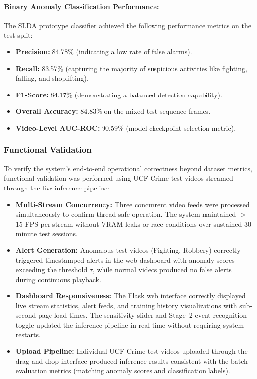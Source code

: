 \documentclass[12pt]{article}
\begin{document}
\paragraph{Binary Anomaly Classification Performance:}
The SLDA prototype classifier achieved the following performance metrics on the test split:
\begin{itemize}
    \item \textbf{Precision:} 84.78\% (indicating a low rate of false alarms).
    \item \textbf{Recall:} 83.57\% (capturing the majority of suspicious activities like fighting, falling, and shoplifting).
    \item \textbf{F1-Score:} 84.17\% (demonstrating a balanced detection capability).
    \item \textbf{Overall Accuracy:} 84.83\% on the mixed test sequence frames.
    \item \textbf{Video-Level AUC-ROC:} 90.59\% (model checkpoint selection metric).
\end{itemize}

\subsubsection{Functional Validation}
To verify the system's end-to-end operational correctness beyond dataset metrics, functional validation was performed using UCF-Crime test videos streamed through the live inference pipeline:
\begin{itemize}
    \item \textbf{Multi-Stream Concurrency:} Three concurrent video feeds were processed simultaneously to confirm thread-safe operation. The system maintained $>$15 FPS per stream without VRAM leaks or race conditions over sustained 30-minute test sessions.
    \item \textbf{Alert Generation:} Anomalous test videos (Fighting, Robbery) correctly triggered timestamped alerts in the web dashboard with anomaly scores exceeding the threshold $\tau$, while normal videos produced no false alerts during continuous playback.
    \item \textbf{Dashboard Responsiveness:} The Flask web interface correctly displayed live stream statistics, alert feeds, and training history visualizations with sub-second page load times. The sensitivity slider and Stage~2 event recognition toggle updated the inference pipeline in real time without requiring system restarts.
    \item \textbf{Upload Pipeline:} Individual UCF-Crime test videos uploaded through the drag-and-drop interface produced inference results consistent with the batch evaluation metrics (matching anomaly scores and classification labels).
\end{itemize}
\end{document}

